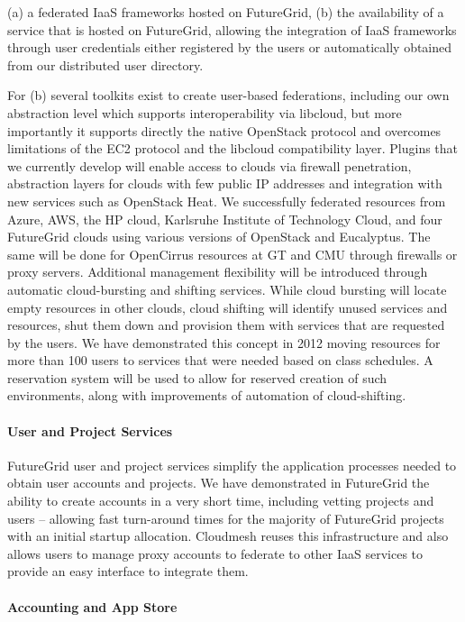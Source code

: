 \documentclass{tex/sig-alternate-2013}
\newcommand{\todo}[1]{{\color{red}{#1}}}
\begin{document}
(a) a federated IaaS frameworks hosted on FutureGrid,
(b) the availability of a service that is hosted on FutureGrid, allowing the integration of IaaS frameworks through user credentials either registered by the users or automatically obtained from our distributed user directory.


For (b) several toolkits exist to create user-based federations, including our own abstraction level which supports interoperability via libcloud, but more importantly it supports directly the native OpenStack protocol and overcomes limitations of the EC2 protocol and the libcloud compatibility layer. Plugins that we currently develop will enable access to clouds via firewall penetration, abstraction layers for clouds with few public IP addresses and integration with new services such as OpenStack Heat. We successfully federated resources from Azure, AWS, the HP cloud, Karlsruhe Institute of Technology Cloud, and four FutureGrid clouds using various versions of OpenStack and Eucalyptus. The same will be done for OpenCirrus resources at GT and CMU through firewalls or proxy servers.
Additional management flexibility will be introduced through automatic cloud-bursting and shifting services. While cloud bursting will locate empty resources in other clouds, cloud shifting will identify unused services and resources, shut them down and provision them with services that are requested by the users. We have demonstrated this concept in 2012 moving resources for more than 100 users to services that were needed based on class schedules. A reservation system will be used to allow for reserved creation of such environments, along with improvements of automation of cloud-shifting.


\paragraph{User and Project Services}
\todo{read}

FutureGrid user and project services simplify the application processes needed to obtain user accounts and projects. We have demonstrated in FutureGrid the ability to create accounts in a very short time, including vetting projects and users -- allowing fast turn-around times for the majority of FutureGrid projects with an initial startup allocation. Cloudmesh reuses this infrastructure and also allows users to manage proxy accounts to federate to other IaaS services to provide an easy interface to integrate them.


\paragraph{Accounting and App Store}
\todo{read}
\end{document}
